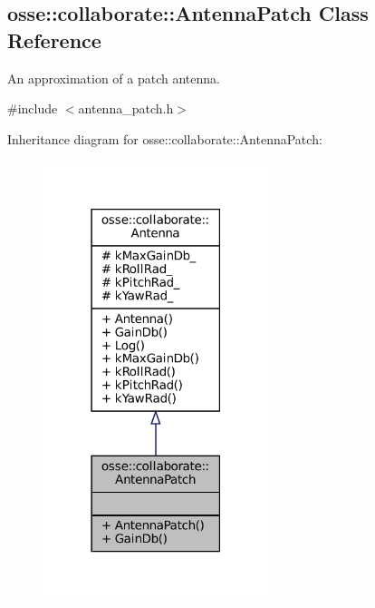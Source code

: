 \hypertarget{classosse_1_1collaborate_1_1_antenna_patch}{}\subsection{osse\+:\+:collaborate\+:\+:Antenna\+Patch Class Reference}
\label{classosse_1_1collaborate_1_1_antenna_patch}


An approximation of a patch antenna.  




{\ttfamily \#include $<$antenna\+\_\+patch.\+h$>$}



Inheritance diagram for osse\+:\+:collaborate\+:\+:Antenna\+Patch\+:
\nopagebreak
\begin{figure}[H]
\begin{center}
\leavevmode
\includegraphics[width=186pt]{classosse_1_1collaborate_1_1_antenna_patch__inherit__graph}
\end{center}
\end{figure}
